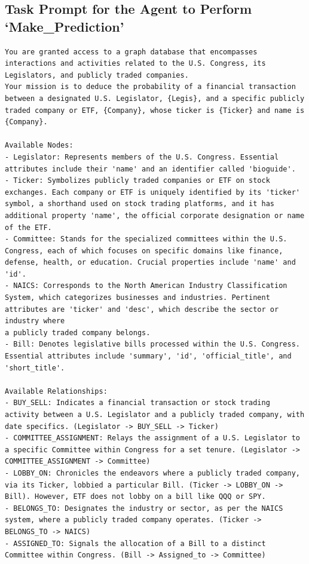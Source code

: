 \documentclass[15pt,letterpaper]{article}
\begin{document}
\subsection*{Task Prompt for the Agent to Perform `Make\_Prediction'}\label{app:log:task_prompt}
\begin{Verbatim}[breaklines=true, frame=single]
You are granted access to a graph database that encompasses interactions and activities related to the U.S. Congress, its Legislators, and publicly traded companies. 
Your mission is to deduce the probability of a financial transaction between a designated U.S. Legislator, {Legis}, and a specific publicly traded company or ETF, {Company}, whose ticker is {Ticker} and name is {Company}.

Available Nodes:
- Legislator: Represents members of the U.S. Congress. Essential attributes include their 'name' and an identifier called 'bioguide'.
- Ticker: Symbolizes publicly traded companies or ETF on stock exchanges. Each company or ETF is uniquely identified by its 'ticker' symbol, a shorthand used on stock trading platforms, and it has additional property 'name', the official corporate designation or name of the ETF.
- Committee: Stands for the specialized committees within the U.S. Congress, each of which focuses on specific domains like finance, defense, health, or education. Crucial properties include 'name' and 'id'.
- NAICS: Corresponds to the North American Industry Classification System, which categorizes businesses and industries. Pertinent attributes are 'ticker' and 'desc', which describe the sector or industry where 
a publicly traded company belongs.
- Bill: Denotes legislative bills processed within the U.S. Congress. Essential attributes include 'summary', 'id', 'official_title', and 'short_title'.

Available Relationships:
- BUY_SELL: Indicates a financial transaction or stock trading activity between a U.S. Legislator and a publicly traded company, with date specifics. (Legislator -> BUY_SELL -> Ticker)
- COMMITTEE_ASSIGNMENT: Relays the assignment of a U.S. Legislator to a specific Committee within Congress for a set tenure. (Legislator -> COMMITTEE_ASSIGNMENT -> Committee)
- LOBBY_ON: Chronicles the endeavors where a publicly traded company, via its Ticker, lobbied a particular Bill. (Ticker -> LOBBY_ON -> Bill). However, ETF does not lobby on a bill like QQQ or SPY.
- BELONGS_TO: Designates the industry or sector, as per the NAICS system, where a publicly traded company operates. (Ticker -> BELONGS_TO -> NAICS)
- ASSIGNED_TO: Signals the allocation of a Bill to a distinct Committee within Congress. (Bill -> Assigned_to -> Committee)


\end{Verbatim}
\end{document}
